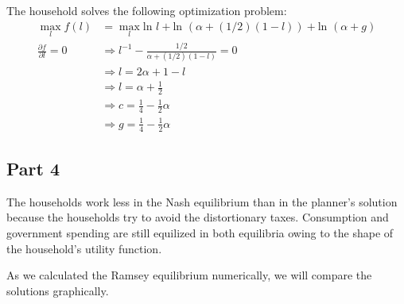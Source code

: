 \documentclass[11pt]{article} %
\begin{document}
The household solves the following optimization problem:
\begin{align*}
\max_{l} f(l) &= \max_{l} \text{ln }l +\text{ln }(\alpha + (1/2) (1-l)) +\text{ln }(\alpha + g) \\
\frac{\partial f}{\partial l} = 0 &\Rightarrow l^{-1} -\frac{1/2}{\alpha + (1/2)(1-l)} = 0\\
&\Rightarrow l = 2\alpha + 1 - l \\
&\Rightarrow l = \alpha + \frac{1}{2}\\
&\Rightarrow c = \frac{1}{4} - \frac{1}{2}\alpha \\
&\Rightarrow g = \frac{1}{4} - \frac{1}{2}\alpha
\end{align*}

\subsection{Part 4}
The households work less in the Nash equilibrium than in the planner's solution because the households try to avoid the distortionary taxes.  Consumption and government spending are still equilized in both equilibria owing to the shape of the household's utility function.

As we calculated the Ramsey equilibrium numerically, we will compare the solutions graphically.
\end{document}
